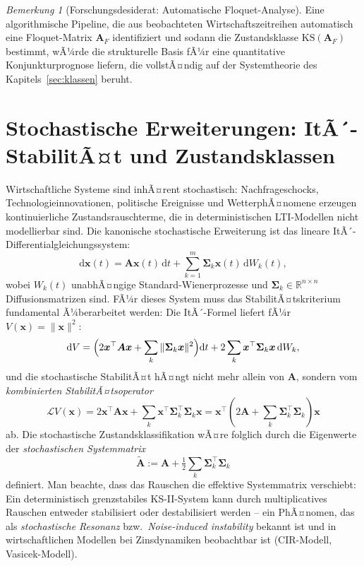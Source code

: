 ﻿\documentclass[12pt, a4paper, titlepage]{report}
\theoremstyle{definition}
\theoremstyle{remark}
\newtheorem{remark}[theorem]{Bemerkung}
\newcommand{\R}{\mathbb{R}}
\newcommand{\vx}{\bm{x}}
\newcommand{\vA}{\bm{A}}
\newcommand{\vSigma}{\bm{\Sigma}}
\newcommand{\T}{\top}
\newcommand{\KS}{\mathrm{KS}}
\begin{document}
\begin{remark}[Forschungsdesiderat: Automatische Floquet-Analyse]
Eine algorithmische Pipeline, die aus beobachteten Wirtschaftszeitreihen automatisch
eine Floquet-Matrix $\vA_F$ identifiziert und sodann die Zustandsklasse $\KS(\vA_F)$
bestimmt, wÃ¼rde die strukturelle Basis fÃ¼r eine quantitative Konjunkturprognose
liefern, die vollstÃ¤ndig auf der Systemtheorie des Kapitels~\ref{sec:klassen}
beruht.
\end{remark}

\section{Stochastische Erweiterungen: ItÃ´-StabilitÃ¤t und Zustandsklassen}
\label{subsec:stochastisch}

Wirtschaftliche Systeme sind inhÃ¤rent stochastisch: Nachfrageschocks,
Technologieinnovationen, politische Ereignisse und WetterphÃ¤nomene erzeugen
kontinuierliche Zustandsrauschterme, die in deterministischen LTI-Modellen nicht
modellierbar sind. Die kanonische stochastische Erweiterung ist das lineare
ItÃ´-Differentialgleichungssystem:
\begin{equation}
  \mathrm{d}\vx(t) = \vA\vx(t)\,\mathrm{d}t + \sum_{k=1}^m \vSigma_k\vx(t)\,\mathrm{d}W_k(t),
  \label{eq:ito_system}
\end{equation}
wobei $W_k(t)$ unabhÃ¤ngige Standard-Wienerprozesse und $\vSigma_k \in \R^{n \times n}$
Diffusionsmatrizen sind. FÃ¼r dieses System muss das StabilitÃ¤tskriterium fundamental
Ã¼berarbeitet werden: Die ItÃ´-Formel liefert fÃ¼r $V(\vx) = \|\vx\|^2$:
\begin{equation}
  \mathrm{d}V = \Bigl(2\vx^\T\vA\vx + \sum_k \|\vSigma_k\vx\|^2\Bigr)\mathrm{d}t
    + 2\sum_k \vx^\T\vSigma_k\vx\,\mathrm{d}W_k,
  \label{eq:ito_formel}
\end{equation}
und die stochastische StabilitÃ¤t hÃ¤ngt nicht mehr allein von $\vA$, sondern vom
\emph{kombinierten StabilitÃ¤tsoperator}
\begin{equation}
  \mathcal{L}V(\vx) = 2\vx^\T\vA\vx + \sum_k \vx^\T\vSigma_k^\T\vSigma_k\vx
  = \vx^\T\!\left(2\vA + \sum_k \vSigma_k^\T\vSigma_k\right)\!\vx
  \label{eq:stabop}
\end{equation}
ab. Die stochastische Zustandsklassifikation wÃ¤re folglich durch die Eigenwerte der
\emph{stochastischen Systemmatrix}
\begin{equation}
  \tilde{\vA} := \vA + \tfrac{1}{2}\sum_k \vSigma_k^\T\vSigma_k
  \label{eq:stoch_sysmat}
\end{equation}
definiert. Man beachte, dass das Rauschen die effektive Systemmatrix verschiebt: Ein
deterministisch grenzstabiles KS-II-System kann durch multiplicatives Rauschen
entweder stabilisiert oder destabilisiert werden -- ein PhÃ¤nomen, das als
\emph{stochastische Resonanz} bzw.~\emph{Noise-induced instability} bekannt ist und
in wirtschaftlichen Modellen bei Zinsdynamiken beobachtbar ist (CIR-Modell, Vasicek-Modell).
\end{document}
